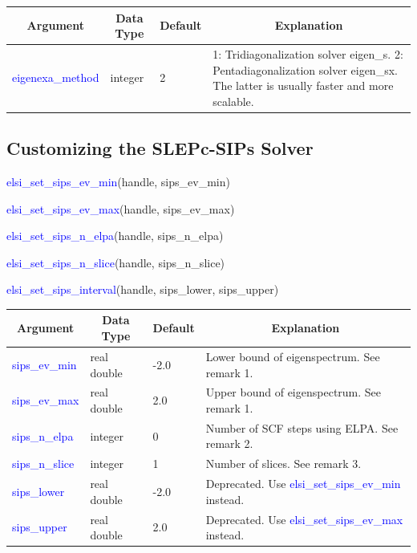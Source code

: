 \documentclass{report}
\newcommand{\tcb}[1]{\textcolor{blue}{#1}}
\begin{document}
\begin{tabular}[]{|p{30mm}|p{20mm}|p{15mm}|p{100mm}|}
\hline
\multicolumn{1}{|c|}{\textbf{Argument}} & \multicolumn{1}{c|}{\textbf{Data Type}} & \multicolumn{1}{c|}{\textbf{Default}} & \multicolumn{1}{c|}{\textbf{Explanation}}\\
\hline
\tcb{eigenexa\_method} & integer & 2 & 1: Tridiagonalization solver eigen\_s. 2: Pentadiagonalization solver eigen\_sx. The latter is usually faster and more scalable.\\
\hline
\end{tabular}

\subsection{Customizing the SLEPc-SIPs Solver}
\label{subsec:setter_sips}
\begin{labeling}{\hspace{6cm}}
\item [\hspace{0.3cm} \tcb{elsi\_set\_sips\_ev\_min}(handle, sips\_ev\_min)]
\item [\hspace{0.3cm} \tcb{elsi\_set\_sips\_ev\_max}(handle, sips\_ev\_max)]
\item [\hspace{0.3cm} \tcb{elsi\_set\_sips\_n\_elpa}(handle, sips\_n\_elpa)]
\item [\hspace{0.3cm} \tcb{elsi\_set\_sips\_n\_slice}(handle, sips\_n\_slice)]
\item [\hspace{0.3cm} \tcb{elsi\_set\_sips\_interval}(handle, sips\_lower, sips\_upper)]
\end{labeling}

\begin{tabular}[]{|p{30mm}|p{20mm}|p{15mm}|p{100mm}|}
\hline
\multicolumn{1}{|c|}{\textbf{Argument}} & \multicolumn{1}{c|}{\textbf{Data Type}} & \multicolumn{1}{c|}{\textbf{Default}} & \multicolumn{1}{c|}{\textbf{Explanation}}\\
\hline
\tcb{sips\_ev\_min}  & real double & -2.0 & Lower bound of eigenspectrum. See remark 1.\\
\hline
\tcb{sips\_ev\_max}  & real double & 2.0  & Upper bound of eigenspectrum. See remark 1.\\
\hline
\tcb{sips\_n\_elpa}  & integer     & 0    & Number of SCF steps using ELPA. See remark 2.\\
\hline
\tcb{sips\_n\_slice} & integer     & 1    & Number of slices. See remark 3.\\
\hline
\tcb{sips\_lower}    & real double & -2.0 & Deprecated. Use \tcb{elsi\_set\_sips\_ev\_min} instead.\\
\hline
\tcb{sips\_upper}    & real double & 2.0  & Deprecated. Use \tcb{elsi\_set\_sips\_ev\_max} instead.\\
\hline
\end{tabular}
\end{document}
